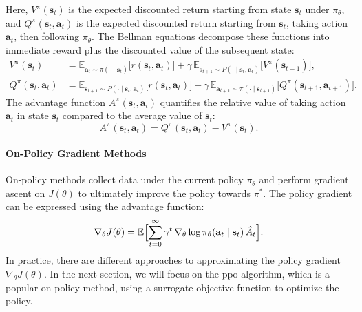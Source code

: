 Here, \(V^\pi(\mathbf{s}_t)\) is the expected discounted return starting from state \(\mathbf{s}_t\) under \(\pi_\theta\), and \(Q^\pi(\mathbf{s}_t,\mathbf{a}_t)\) is the expected discounted return starting from \(\mathbf{s}_t\), taking action \(\mathbf{a}_t\), then following \(\pi_\theta\).
The Bellman equations decompose these functions into immediate reward plus the discounted value of the subsequent state:
\begin{align}
V^\pi(\mathbf{s}_t)
&= \mathbb{E}_{\mathbf{a}_t\sim\pi(\cdot\mid \mathbf{s}_t)}\bigl[r(\mathbf{s}_t,\mathbf{a}_t)\bigr]
  + \gamma\,\mathbb{E}_{\mathbf{s}_{t+1}\sim P(\cdot\mid \mathbf{s}_t,\mathbf{a}_t)}\bigl[V^\pi(\mathbf{s}_{t+1})\bigr],\\
Q^\pi(\mathbf{s}_t,\mathbf{a}_t)
&= \mathbb{E}_{\mathbf{s}_{t+1}\sim P(\cdot\mid \mathbf{s}_t,\mathbf{a}_t)}\bigl[r(\mathbf{s}_t,\mathbf{a}_t)\bigr]
  + \gamma\,\mathbb{E}_{\mathbf{a}_{t+1}\sim\pi(\cdot\mid \mathbf{s}_{t+1})}\bigl[Q^\pi(\mathbf{s}_{t+1},\mathbf{a}_{t+1})\bigr].
\end{align}
The advantage function \(A^\pi(\mathbf{s}_t,\mathbf{a}_t)\) quantifies the relative value of taking action \(\mathbf{a}_t\) in state \(\mathbf{s}_t\) compared to the average value of \(\mathbf{s}_t\):
\begin{equation}
A^\pi(\mathbf{s}_t,\mathbf{a}_t) = Q^\pi(\mathbf{s}_t,\mathbf{a}_t) - V^\pi(\mathbf{s}_t).
\end{equation}

\paragraph{On-Policy Gradient Methods}
On-policy methods collect data under the current policy \(\pi_\theta\) and perform gradient ascent on \(J(\theta)\) to ultimately improve the policy towards \(\pi^*\). The policy gradient can be expressed using the advantage function:
\begin{equation}
\nabla_\theta J(\theta)
= \mathbb{E}\Bigl[\sum_{t=0}^\infty \gamma^t \,\nabla_\theta \log \pi_\theta(\mathbf{a}_t\mid \mathbf{s}_t)\,\hat A_t\Bigr].
\end{equation}
In practice, there are different approaches to approximating the policy gradient \(\nabla_{\theta}J(\theta)\). In the next section, we will focus on the \gls{ppo} algorithm, which is a popular on-policy method, using a surrogate objective function to optimize the policy.
